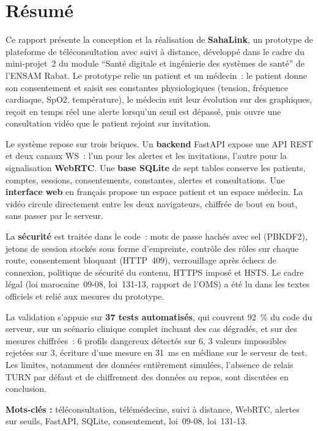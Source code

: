 \chapter*{Résumé}

Ce rapport présente la conception et la réalisation de \textbf{SahaLink}, un prototype de plateforme de téléconsultation avec suivi à distance, développé dans le cadre du mini-projet~2 du module \enquote{Santé digitale et ingénierie des systèmes de santé} de l'\ac{ENSAM} Rabat. Le prototype relie un patient et un médecin~: le patient donne son consentement et saisit ses constantes physiologiques (tension, fréquence cardiaque, \ac{SpO2}, température), le médecin suit leur évolution sur des graphiques, reçoit en temps réel une alerte lorsqu'un seuil est dépassé, puis ouvre une consultation vidéo que le patient rejoint sur invitation.

Le système repose sur trois briques. Un \textbf{backend} FastAPI expose une \ac{API} \ac{REST} et deux canaux \ac{WS}~: l'un pour les alertes et les invitations, l'autre pour la signalisation \textbf{WebRTC}. Une \textbf{base SQLite} de sept tables conserve les patients, comptes, sessions, consentements, constantes, alertes et consultations. Une \textbf{interface web} en français propose un espace patient et un espace médecin. La vidéo circule directement entre les deux navigateurs, chiffrée de bout en bout, sans passer par le serveur.

La \textbf{sécurité} est traitée dans le code~: mots de passe hachés avec sel (\ac{PBKDF2}), jetons de session stockés sous forme d'empreinte, contrôle des rôles sur chaque route, consentement bloquant (HTTP~409), verrouillage après échecs de connexion, politique de sécurité du contenu, \ac{HTTPS} imposé et \ac{HSTS}. Le cadre légal (loi marocaine~09-08, loi~131-13, rapport de l'\ac{OMS}) a été lu dans les textes officiels et relié aux mesures du prototype.

La validation s'appuie sur \textbf{37 tests automatisés}, qui couvrent 92~\% du code du serveur, sur un scénario clinique complet incluant des cas dégradés, et sur des mesures chiffrées~: 6 profils dangereux détectés sur 6, 3 valeurs impossibles rejetées sur 3, écriture d'une mesure en 31~ms en médiane sur le serveur de test. Les limites, notamment des données entièrement simulées, l'absence de relais \ac{TURN} par défaut et de chiffrement des données au repos, sont discutées en conclusion.

\bigskip
\noindent\textbf{Mots-clés :} téléconsultation, télémédecine, suivi à distance, WebRTC, alertes sur seuils, FastAPI, SQLite, consentement, loi~09-08, loi~131-13.

